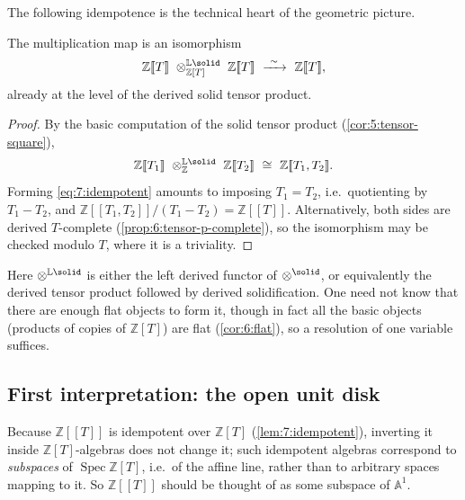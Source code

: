 The following idempotence is the technical heart of the geometric picture.

\begin{lemma}
\label{lem:7:idempotent}
The multiplication map is an isomorphism
\begin{equation}
\label{eq:7:idempotent}
\mathbb{Z}[\![T]\!]\ \otimes^{\mathbb{L}\solid}_{\mathbb{Z}[T]}\
\mathbb{Z}[\![T]\!]\ \xrightarrow{\ \sim\ }\ \mathbb{Z}[\![T]\!],
\end{equation}
already at the level of the derived solid tensor product.
\end{lemma}

\begin{proof}
By the basic computation of the solid tensor product (\cref{cor:5:tensor-square}),
\begin{equation}
\label{eq:7:two-variable-power-series}
\mathbb{Z}[\![T_1]\!]\ \otimes^{\mathbb{L}\solid}_{\mathbb{Z}}\
\mathbb{Z}[\![T_2]\!]\ \cong\ \mathbb{Z}[\![T_1,T_2]\!].
\end{equation}
Forming \eqref{eq:7:idempotent} amounts to imposing $T_1=T_2$, i.e.\
quotienting by $T_1-T_2$, and $\mathbb{Z}[\![T_1,T_2]\!]/(T_1-T_2)
=\mathbb{Z}[\![T]\!]$. Alternatively, both sides are derived $T$-complete
(\cref{prop:6:tensor-p-complete}), so the isomorphism may be checked modulo
$T$, where it is a triviality.
\end{proof}

\begin{remark}
\label{rmk:7:derived-tensor}
Here $\otimes^{\mathbb{L}\solid}$ is either the left derived functor of
$\otimes^{\solid}$, or equivalently the derived tensor product followed by
derived solidification. One need not know that there are enough flat objects to
form it, though in fact all the basic objects (products of copies of
$\mathbb{Z}[T]$) are flat (\cref{cor:6:flat}), so a resolution of one variable
suffices.
\end{remark}

\subsection{First interpretation: the open unit disk}

Because $\mathbb{Z}[\![T]\!]$ is idempotent over $\mathbb{Z}[T]$
(\cref{lem:7:idempotent}), inverting it inside $\mathbb{Z}[T]$-algebras does
not change it; such idempotent algebras correspond to \emph{subspaces} of
$\operatorname{Spec}\mathbb{Z}[T]$, i.e.\ of the affine line, rather than to
arbitrary spaces mapping to it. So $\mathbb{Z}[\![T]\!]$ should be thought of
as some subspace of $\mathbb{A}^1$.

